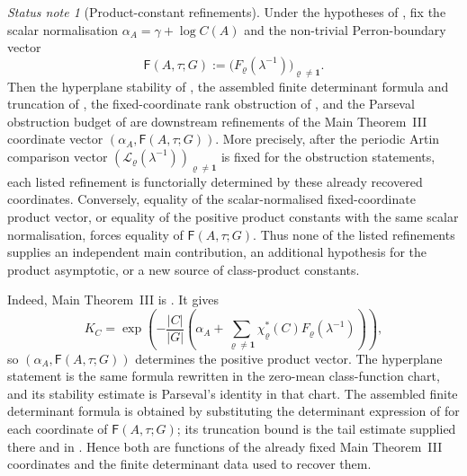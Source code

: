 \documentclass[11pt,a4paper]{amsart}
\theoremstyle{plain}
\theoremstyle{definition}
\theoremstyle{remark}
\newtheorem*{statusnote}{Status note}
\begin{document}
\begin{statusnote}[Product-constant refinements]
  Under the hypotheses of , fix the
  scalar normalisation \(\alpha_A=\gamma+\log C(A)\) and the non-trivial
  Perron-boundary vector
  \[
    \mathsf F(A,\tau;G):=
    \bigl(F_\varrho(\lambda^{-1})\bigr)_{\varrho\ne\mathbf1}.
  \]
  Then the hyperplane stability of
  , the assembled finite
  determinant formula and truncation of
  , the fixed-coordinate
  rank obstruction of ,
  and the Parseval
  obstruction budget of  are downstream
  refinements of the Main Theorem~III coordinate vector
  \((\alpha_A,\mathsf F(A,\tau;G))\).  More precisely, after the periodic
  Artin comparison vector
  \((\mathcal L_\varrho(\lambda^{-1}))_{\varrho\ne\mathbf1}\) is fixed for
  the obstruction statements, each listed refinement is functorially
  determined by these already recovered coordinates.  Conversely, equality of
  the scalar-normalised fixed-coordinate product vector, or equality of the
  positive product
  constants with the same scalar normalisation, forces equality of
  \(\mathsf F(A,\tau;G)\).  Thus none of the listed refinements supplies an
  independent main contribution, an additional hypothesis for the product
  asymptotic, or a new source of class-product constants.
\end{statusnote}

Indeed, Main Theorem~III is .  It gives
  \[
    K_C=
    \exp\!\left(-\frac{|C|}{|G|}
      \left(\alpha_A+
        \sum_{\varrho\ne\mathbf1}\chi_\varrho^\ast(C)
          F_\varrho(\lambda^{-1})\right)
      \right),
  \]
  so \((\alpha_A,\mathsf F(A,\tau;G))\) determines the positive product
  vector.  The hyperplane statement is the same formula rewritten in the
  zero-mean class-function chart, and its stability estimate is Parseval's
  identity in that chart.  The assembled finite determinant formula is obtained
  by substituting the determinant expression of
   for each coordinate of
  \(\mathsf F(A,\tau;G)\); its truncation bound is the tail estimate supplied
  there and in .  Hence both are
  functions of the already fixed Main Theorem~III coordinates and the finite
  determinant data used to recover them.
\end{document}
